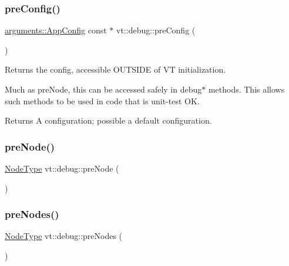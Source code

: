\mbox{\label{namespacevt_1_1debug_a852027d87cfb65bb21dd8ce1e8c23c61}} 
\subsubsection{\texorpdfstring{pre\+Config()}{preConfig()}}
{\footnotesize\ttfamily \hyperlink{structvt_1_1arguments_1_1_app_config}{arguments\+::\+App\+Config} const  $\ast$ vt\+::debug\+::pre\+Config (\begin{DoxyParamCaption}{ }\end{DoxyParamCaption})}



Returns the config, accessible O\+U\+T\+S\+I\+DE of VT initialization. 

Much as pre\+Node, this can be accessed safely in debug$\ast$ methods. This allows such methods to be used in code that is unit-\/test OK.

\begin{DoxyReturn}{Returns}
A configuration; possible a default configuration. 
\end{DoxyReturn}
\mbox{\label{namespacevt_1_1debug_a0f9acc324c2b3308760aa13b29dd9736}} 
\subsubsection{\texorpdfstring{pre\+Node()}{preNode()}}
{\footnotesize\ttfamily \hyperlink{namespacevt_a866da9d0efc19c0a1ce79e9e492f47e2}{Node\+Type} vt\+::debug\+::pre\+Node (\begin{DoxyParamCaption}{ }\end{DoxyParamCaption})}

\mbox{\label{namespacevt_1_1debug_ab9a204b679ea705a255d3cb4dcce02f3}} 
\subsubsection{\texorpdfstring{pre\+Nodes()}{preNodes()}}
{\footnotesize\ttfamily \hyperlink{namespacevt_a866da9d0efc19c0a1ce79e9e492f47e2}{Node\+Type} vt\+::debug\+::pre\+Nodes (\begin{DoxyParamCaption}{ }\end{DoxyParamCaption})}

